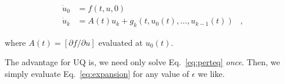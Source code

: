 \documentclass[11pt]{article}
\begin{document}
\begin{equation}
        \label{eq:perteq}
        \begin{aligned}
                \dot{u}_0 &= f( t , u , 0 ) \\
                \dot{u}_k &= A(t) u_k + g_k( t , u_0(t) , \dots , u_{k-1}(t) ) \;\;\; ,
        \end{aligned}
\end{equation}

\noindent where $A(t) = [ \partial f / \partial u ]$ evaluated at $u_0(t)$.

\noindent The advantage for UQ is, we need only solve Eq.~\ref{eq:perteq} {\it once}. 
Then, we simply evaluate Eq.~\ref{eq:expansion} for any value of $\epsilon$ we like.

\section*{}
\newpage


\end{document}

